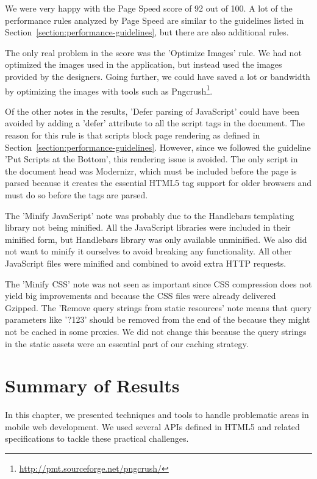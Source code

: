 We were very happy with the Page Speed score of 92 out of 100. A lot
of the performance rules analyzed by Page Speed are similar to the
guidelines listed in Section~\ref{section:performance-guidelines}, but
there are also additional rules.

The only real problem in the score was the 'Optimize Images' rule. We
had not optimized the images used in the application, but instead used
the images provided by the designers. Going further, we could have
saved a lot or bandwidth by optimizing the images with tools such as
Pngcrush\footnote{\url{http://pmt.sourceforge.net/pngcrush/}}.

Of the other notes in the results, 'Defer parsing of JavaScript' could
have been avoided by adding a 'defer' attribute to all the script tags
in the document. The reason for this rule is that scripts block page
rendering as defined in
Section~\ref{section:performance-guidelines}. However, since we
followed the guideline 'Put Scripts at the Bottom', this rendering
issue is avoided. The only script in the document head was Modernizr,
which must be included before the page is parsed because it creates
the essential HTML5 tag support for older browsers and must do so
before the tags are parsed.

The 'Minify JavaScript' note was probably due to the Handlebars
templating library not being minified. All the JavaScript libraries
were included in their minified form, but Handlebars library was only
available unminified. We also did not want to minify it ourselves to
avoid breaking any functionality. All other JavaScript files were
minified and combined to avoid extra HTTP requests.

The 'Minify CSS' note was not seen as important since CSS compression
does not yield big improvements and because the CSS files were already
delivered Gzipped. The 'Remove query strings from static resources'
note means that query parameters like '?123' should be removed from
the end of the  because they might not be cached in some
proxies. We did not change this because the query strings in the
static assets were an essential part of our caching strategy.

\section{Summary of Results}


In this chapter, we presented techniques and tools to handle
problematic areas in mobile web development. We used several APIs
defined in HTML5 and related specifications to tackle these practical
challenges.

